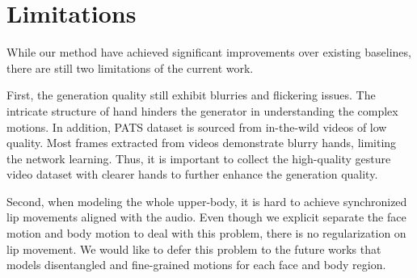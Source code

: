 \section{Limitations}
\label{sec:limitation}

While our method have achieved significant improvements over existing baselines, there are still two limitations of the current work.

First, the generation quality still exhibit blurries and flickering issues. The intricate structure of hand hinders the generator in understanding the complex motions. In addition, PATS dataset is sourced from in-the-wild videos of low quality. Most frames extracted from videos demonstrate blurry hands, limiting the network learning. Thus, it is important to collect the high-quality gesture video dataset with clearer hands to further enhance the generation quality.

Second, when modeling the whole upper-body, it is hard to achieve synchronized lip movements aligned with the audio. Even though we explicit separate the face motion and body motion to deal with this problem, there is no regularization on lip movement. We would like to defer this problem to the future works that models disentangled and fine-grained motions for each face and body region.

